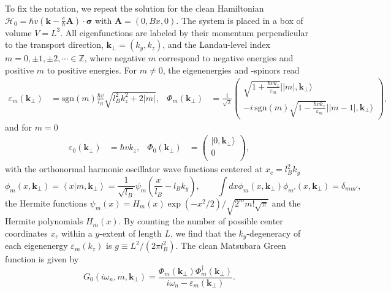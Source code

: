 \documentclass[aps,prb,10pt,amsmath,amssymb,twocolumn,floatfix,superscriptaddress,showpacs,numerical,footinbib]{revtex4-1}
\newcommand{\ket}[1]{| #1 \rangle}
\newcommand{\sgn}[1]{\mathrm{sgn} \left(#1 \right)}
\begin{document}
\begin{widetext}
To fix the notation, we repeat the solution for the clean Hamiltonian $\mathcal{H}_0 = \hbar v \left(\mathbf{k}-\frac{e}{\hbar}\mathbf{A}\right)\cdot\boldsymbol{\sigma}$ with $\mathbf{A} = ( 0 , Bx , 0)$.
%
The system is placed in a box of volume $V=L^3$.
%
All eigenfunctions are labeled by their momentum perpendicular to the transport direction, $\mathbf{k}_\perp = (k_y,k_z)$, and the Landau-level index $m = 0,\pm1 , \pm2 ,\cdots \in\mathbb{Z}$, where negative $m$ correspond to negative energies and positive $m$ to positive energies.
%
For $m\neq0$, the eigenenergies and -spinors read\cite{Abrikosov1998}
\begin{align}
 \varepsilon_m (\mathbf{k}_\perp)
 &= \sgn{m} \frac{\hbar v}{l_B} \sqrt{l_B^2 k_z^2 + 2 |m|},
 & \Phi_m (\mathbf{k}_\perp) &= \frac{1}{\sqrt{2}}
 \begin{pmatrix}
 \sqrt{1+\frac{\hbar vk_{z}}{\varepsilon_{m}}} \ket{|m|, \mathbf{k}_\perp } \\
 -i \, \sgn{m} \sqrt{1-\frac{\hbar vk_{z}}{\varepsilon_{m}}} \ket{|m-1|, \mathbf{k}_\perp }
 \end{pmatrix},
\end{align}
%
and for $m=0$
%
\begin{align}
 \varepsilon_0 (\mathbf{k}_\perp)
 &= \hbar v k_z,
 & \Phi_0 (\mathbf{k}_\perp) &= 
 \begin{pmatrix}
 \ket{0, \mathbf{k}_\perp } \\
  0 \\
 \end{pmatrix},
\end{align}
with the orthonormal harmonic oscillator wave functions centered at $x_c = l_B^2 k_y$
%
\begin{equation}
 \phi_m (x,\mathbf{k}_\perp ) = \left\langle \left. x \right| m,\mathbf{k}_\perp \right\rangle = \frac{1}{\sqrt{l_B}} \psi_m \left( \frac{x}{l_B} - l_B k_y \right), 
 \qquad
 \int d x \phi_m (x, \mathbf{k}_\perp) \phi_{m'} (x,\mathbf{k}_\perp ) = \delta_{mm'},
\end{equation}
%
the Hermite functions $\psi_m (x) = H_m(x) \exp ( - x^2/2) /\sqrt{2^m m! \sqrt{\pi}}$ and the Hermite polynomials $H_m(x)$.
%
By counting the number of possible center coordinates $x_{c}$ within a $y$-extent of length $L$, we find that the $k_{y}$-degeneracy of each eigenenergy $\varepsilon_{m}(k_{z})$ is $g \equiv L^2/(2\pi l_{B}^{2})$.
%
The clean Matsubara Green function is given by
%
\begin{equation}
G_0 \left( i \omega_n ,m, \mathbf{k}_\perp \right) = \frac{\Phi_{m} (\mathbf{k_\perp}) \Phi_{m}^\dagger (\mathbf{k}_\perp)}{i\omega_{n}-\varepsilon_{m}(\mathbf{k}_\perp)} .

\end{equation}
\end{widetext}
\end{document}
